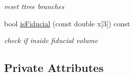 \begin{DoxyCompactItemize}
\begin{DoxyCompactList}\small\item\em reset ttree branches \end{DoxyCompactList}\item 
\hypertarget{classselection_1_1CC0piNpSelection_ac3f55283ce26e2af8d5ba86a9faf0d23}{bool \hyperlink{classselection_1_1CC0piNpSelection_ac3f55283ce26e2af8d5ba86a9faf0d23}{is\-Fiducial} (const double x\mbox{[}3\mbox{]}) const }\label{classselection_1_1CC0piNpSelection_ac3f55283ce26e2af8d5ba86a9faf0d23}

\begin{DoxyCompactList}\small\item\em check if inside fiducial volume \end{DoxyCompactList}\end{DoxyCompactItemize}
\subsection*{Private Attributes}
